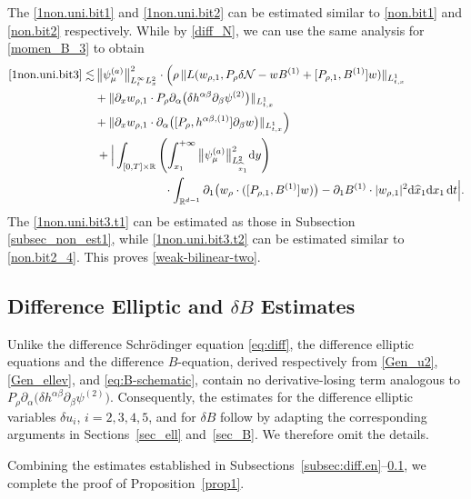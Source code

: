 \documentclass[11pt,letterpaper,reqno]{amsart}
\numberwithin{equation}{section}
\theoremstyle{definition}
\theoremstyle{remark}
\newcommand{\pa}{\partial}
\begin{document}
The \eqref{1non.uni.bit1} and \eqref{1non.uni.bit2} can be estimated similar to \eqref{non.bit1} and \eqref{non.bit2} respectively. While by \eqref{diff_N}, we can use the same analysis for \eqref{momen_B_3} to obtain
\begin{align}
    \eqref{1non.uni.bit3} \lesssim &\,     \big\|\psi_\mu^{(a)}\big\|^2_{L^\infty_t L^2_{x}}    \cdot \Big(  \rho\,  \| L( w_{\rho,1}, P_\rho\delta \mathcal{N} -wB^{(1)}+ [P_{\rho,1} , B^{(1)}]w )\|_{L^1_{t,x}} \nonumber \\
 & + \|  \pa_x w_{\rho,1} \cdot P_\rho\partial_\alpha
\big(\delta h^{\alpha\beta}\partial_\beta\psi^{(2)}\big) \|_{L^1_{t,x}}  \label{1non.uni.bit3.t1}\\
 &+ \|  \pa_x w_{\rho,1} \cdot \partial_\alpha\big([P_\rho,h^{\alpha\beta,(1)}]\partial_\beta w\big)\|_{L^1_{t,x}}\Big) \nonumber\\
    & \label{1non.uni.bit3.t2}\, +\Big| \int_{[0,T]\times \mathbb{R}}  \left( \int^{+\infty}_{x_1}   \big\|\psi_\mu^{(a)}\big\|^2_{L^2_{\widehat{x}_1}}   \mathrm{ d} y\right) \\
  &\qquad \qquad\qquad \cdot  \int_{\mathbb{R}^{d-1}}  \pa_{1}  \big(w_\rho \cdot  ([P_{\rho,1}, B^{(1)}]w)\big) -\pa_{1}B^{(1)} \cdot |w_{\rho,1} |^2 \mathrm{d} \widehat{x}_1 \mathrm{ d} x_1 \, \mathrm{ d} t\Big|. \nonumber
\end{align}
The  \eqref{1non.uni.bit3.t1} can be estimated as those in Subsection \ref{subsec_non_est1}, while \eqref{1non.uni.bit3.t2} can be estimated similar to \eqref{non.bit2_4}. This proves \eqref{weak-bilinear-two}.


 

\subsection{Difference Elliptic and \texorpdfstring{\(\delta B\)}{delta B} Estimates} \label{subsec:uniB}
Unlike the difference Schr\"odinger equation \eqref{eq:diff}, the difference elliptic equations and the difference \(B\)-equation, derived respectively from \eqref{Gen_u2}, \eqref{Gen_ellev}, and \eqref{eq:B-schematic}, contain no derivative-losing term analogous to \( P_\rho\partial_\alpha \bigl( \delta h^{\alpha\beta}\partial_\beta\psi^{(2)} \bigr). \) Consequently, the estimates for the difference elliptic variables \(\delta u_i\), \(i=2,3,4,5\), and for \(\delta B\) follow by adapting the corresponding arguments in Sections~\ref{sec_ell} and~\ref{sec_B}. We therefore omit the details.


Combining the estimates established in Subsections~\ref{subsec:diff.en}--\ref{subsec:uniB}, we complete the proof of Proposition~\ref{prop1}.
\end{document}
